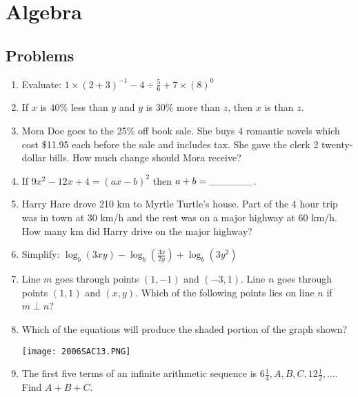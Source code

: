 \documentclass[../uilmath.tex]{subfiles}
\begin{document}
\chapter{Algebra}
\section*{Problems}
\begin{enumerate}[label=\bfseries\arabic*.]
    \item %
    Evaluate: $1\times (2+3)^{-1}-4\div \frac{5}{6}+7\times(8)^0$
    
    \item %
    If $x$ is $40\%$ less than $y$ and $y$ is $30\%$ more than $z$, then $x$ is \blank than $z$.

    \item %
    Mora Doe goes to the 25\% off book sale. She buys 
    4 romantic novels which cost \$11.95 each before the sale 
    and includes tax. She gave the clerk 2 twenty-dollar bills. How much change should Mora receive?

    \item %
    If $9x^2-12x+4=(ax-b)^2$ then $a+b=\_\_\_\_\_\_$.
    
    \item %
    Harry Hare drove 210 km to Myrtle Turtle's house. Part of the 4 hour trip was in town at 30 km/h 
    and the rest was on a major highway at 60 km/h. How many km did Harry drive on the major highway?

    \item %
    Simplify: $\log_b (3xy)-\log_b(\frac{3x}{2y})+\log_b (3y^2)$

    \item %
    Line $m$ goes through points $(1,-1)$ and $(-3,1)$. Line $n$ goes through points $(1,1)$ and $(x,y)$. Which of the following points lies on line $n$ if $m\perp n$?

    \item %
    Which of the equations will produce the shaded portion of the graph shown?
    \begin{center}
        \texttt{[image: 2006SAC13.PNG]}
    \end{center}

    \item %
    The first five terms of an infinite arithmetic sequence is $6\frac{1}{4},A,B,C,12\frac{1}{2},\dots$. Find $A+B+C$.


\end{enumerate}
\end{document}
